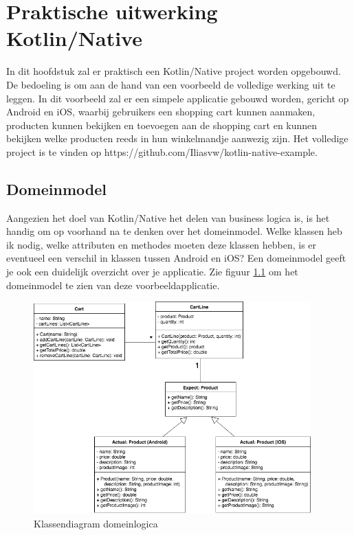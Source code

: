 \chapter{Praktische uitwerking Kotlin/Native}
\label{ch:praktisch}
In dit hoofdstuk zal er praktisch een Kotlin/Native project worden opgebouwd. De bedoeling is om aan de hand van een voorbeeld de volledige werking uit te leggen. In dit voorbeeld zal er een simpele applicatie gebouwd worden, gericht op Android en iOS, waarbij gebruikers een shopping cart kunnen aanmaken, producten kunnen bekijken en toevoegen aan de shopping cart en kunnen bekijken welke producten reeds in hun winkelmandje aanwezig zijn. Het volledige project is te vinden op https://github.com/Iliasvw/kotlin-native-example.

\section{Domeinmodel}
Aangezien het doel van Kotlin/Native het delen van business logica is, is het handig om op voorhand na te denken over het domeinmodel. Welke klassen heb ik nodig, welke attributen en methodes moeten deze klassen hebben, is er eventueel een verschil in klassen tussen Android en iOS? Een domeinmodel geeft je ook een duidelijk overzicht over je applicatie. Zie figuur \ref{fig:domeinmodel-kn} om het domeinmodel te zien van deze voorbeeldapplicatie.

\begin{figure} [ht]
	\centering
	\includegraphics[width=0.95\textwidth]{img/domeinmodel.png}
	\caption{Klassendiagram domeinlogica}
	\label{fig:domeinmodel-kn}
\end{figure}

